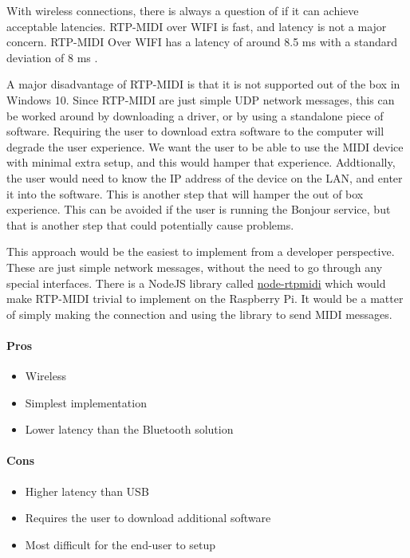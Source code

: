 With wireless connections, there is always a question of if it can achieve acceptable
latencies. RTP-MIDI over WIFI is fast, and latency is not a major concern. RTP-MIDI Over
WIFI has a latency of around 8.5 ms with a standard deviation of 8 ms
\autocite{inproceedings}.

A major disadvantage of RTP-MIDI is that it is not supported out of the box in Windows 10.
Since RTP-MIDI are just simple UDP network messages, this can be worked around by
downloading a driver, or by using a standalone piece of software. Requiring the user to
download extra software to the computer will degrade the user experience. We want the user
to be able to use the MIDI device with minimal extra setup, and this would hamper that
experience. Addtionally, the user would need to know the IP address of the device on the
LAN, and enter it into the software. This is another step that will hamper the out of box
experience. This can be avoided if the user is running the Bonjour service, but that is
another step that could potentially cause problems.

This approach would be the easiest to implement from a developer perspective. These are
just simple network messages, without the need to go through any special interfaces. There
is a NodeJS library called \url{node-rtpmidi} which would make RTP-MIDI trivial to
implement on the Raspberry Pi. It would be a matter of simply making the connection and
using the library to send MIDI messages.

\paragraph{Pros}

\begin{itemize}
  \item Wireless
  \item Simplest implementation
  \item Lower latency than the Bluetooth solution
\end{itemize}

\paragraph{Cons}

\begin{itemize}
  \item Higher latency than USB
  \item Requires the user to download additional software
  \item Most difficult for the end-user to setup
\end{itemize}

